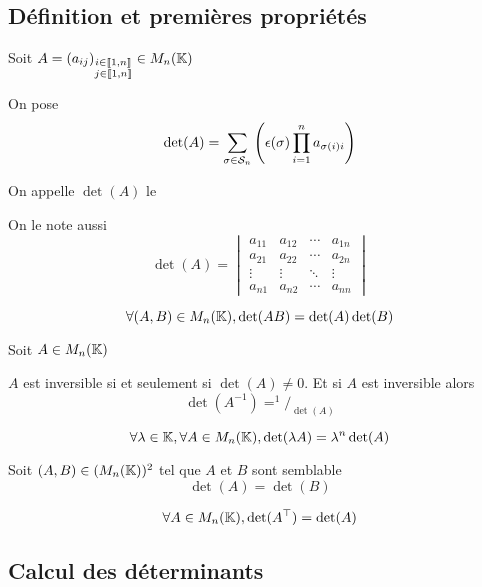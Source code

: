 \subsection{Définition et premières propriétés}

\begin{dfn}
  Soit $A = (a_{ij})_{\mind{i}{j}{n}{n}} \in M_n(\K)$
  
  On pose
  \[
    \det(A) = \sum_{\sigma \in \sym_n} \left( \epsilon(\sigma) \prod_{i = 1}^n a_{\sigma(i)i} \right)
  \]

  On appelle $\det(A)$ le 

  On le note aussi
  \[
    \det(A) =
    \begin{vmatrix}
      a_{1 1} & a_{1 2} & \cdots & a_{1 n} \\
      a_{2 1} & a_{2 2} & \cdots & a_{2 n} \\
      \vdots & \vdots & \ddots & \vdots \\
      a_{n 1} & a_{n 2} & \cdots & a_{n n} 
    \end{vmatrix}
  \]
\end{dfn}

\begin{prp}
  \[
    \forall (A, B) \in M_n(\K),\det(A B) = \det(A)\det(B)
  \]
\end{prp}

\begin{prp}
  Soit $A \in M_n(\K)$

  $A$ est inversible si et seulement si $\det(A) \neq 0$.
  Et si $A$ est inversible alors
  \[
    \det(A^{-1}) = ^1/_{\det(A)}
  \]
\end{prp}

\begin{prp}
  \[
    \forall \lambda \in \K, \forall A \in M_n(\K), \det(\lambda A) = \lambda^n \det(A)
  \]
\end{prp}

\begin{cor}
  Soit $(A, B) \in (M_n(\K))^2$ tel que $A$ et $B$ sont semblable
  \[
    \det(A) = \det(B)
  \]
\end{cor}

\begin{prp}
  \[
    \forall A \in M_n(\K), \det(A^\top) = \det(A)
  \]
\end{prp}

\subsection{Calcul des déterminants}

